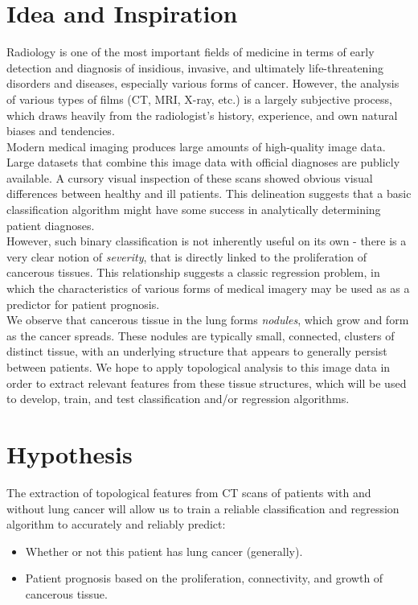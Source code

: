 \documentclass[12pt]{report}
\begin{document}
\section{Idea and Inspiration}
\indent Radiology is one of the most important fields of medicine in terms of early detection and diagnosis of insidious, invasive, and ultimately life-threatening disorders and diseases, especially various forms of cancer. However, the analysis of various types of films (CT, MRI, X-ray, etc.) is a largely subjective process, which draws heavily from the radiologist's history, experience, and own natural biases and tendencies. \\
\indent Modern medical imaging produces large amounts of high-quality image data. Large datasets that combine this image data with official diagnoses are publicly available. A cursory visual inspection of these scans showed obvious visual differences between healthy and ill patients. This delineation suggests that a basic classification algorithm might have some success in analytically determining patient diagnoses. \\
\indent However, such binary classification is not inherently useful on its own - there is a very clear notion of \textit{severity}, that is directly linked to the proliferation of cancerous tissues. This relationship suggests a classic regression problem, in which the characteristics of various forms of medical imagery may be used as as a predictor for patient prognosis.\\
\indent We observe that cancerous tissue in the lung forms \textit{nodules}, which grow and form as the cancer spreads. These nodules are typically small, connected, clusters of distinct tissue, with an underlying structure that appears to generally persist between patients. We hope to apply topological analysis to this image data in order to extract relevant features from these tissue structures, which will be used to develop, train, and test classification and/or regression algorithms.

\section{Hypothesis}
The extraction of topological features from CT scans of patients with and without lung cancer will allow us to train a reliable classification and regression algorithm to accurately and reliably predict:
\begin{itemize}
\item Whether or not this patient has lung cancer (generally).
\item Patient prognosis based on the proliferation, connectivity, and growth of cancerous tissue.
\end{itemize}
\end{document}
